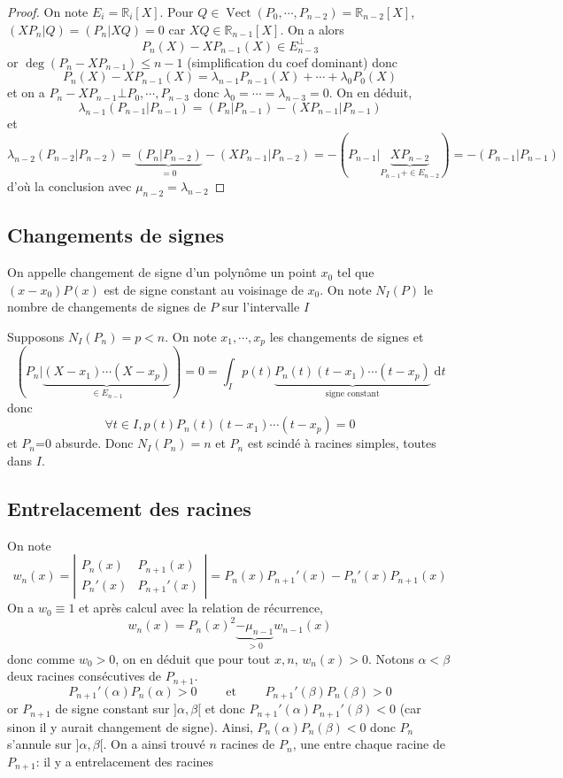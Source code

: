 \documentclass{article}
\theoremstyle{definition}
\DeclareMathOperator{\Vect}{Vect}
\begin{document}
\begin{proof} On note $E_i=\mathbb R_i[X]$.
Pour $Q\in\Vect(P_0, \cdots, P_{n-2})=\mathbb R_{n-2}[X]$, $(XP_n|Q)=(P_n|XQ)=0$ car $XQ\in\mathbb R_{n-1}[X]$. On a alors \[
    P_n(X)-XP_{n-1}(X)\in E_{n-3}^\bot
\]
or $\deg (P_n-XP_{n-1})\leq n-1$ (simplification du coef dominant) donc \[
    P_n(X)-XP_{n-1}(X)=\lambda_{n-1}P_{n-1}(X)+\cdots +\lambda_0P_0(X)
\]
et on a $P_n-XP_{n-1}\bot P_0, \cdots, P_{n-3}$ donc $\lambda_0=\cdots =\lambda_{n-3}=0$. On en déduit, \[
    \lambda_{n-1}(P_{n-1}|P_{n-1})=(P_n|P_{n-1})-(XP_{n-1}|P_{n-1})
\]
et \[
    \lambda_{n-2}(P_{n-2}|P_{n-2})=\underbrace{(P_n|P_{n-2})}_{=0}-(XP_{n-1}|P_{n-2})=-(P_{n-1}|\underbrace{XP_{n-2}}_{P_{n-1}+\in E_{n-2}})=-(P_{n-1}|P_{n-1})
\]
d'où la conclusion avec $\mu_{n-2}=\lambda_{n-2}$
\end{proof}

\subsection{Changements de signes}

On appelle changement de signe d'un polynôme un point $x_0$ tel que $(x-x_0)P(x)$ est de signe constant au voisinage de $x_0$. On note $N_I(P)$ le nombre de changements de signes de $P$ sur l'intervalle $I$

Supposons $N_I(P_n)=p<n$. On note $x_1, \cdots, x_p$ les changements de signes et \[
    (P_n | \underbrace{(X-x_1)\cdots (X-x_p)}_{\in E_{n-1}})=0=\int_Ip(t)\underbrace{P_n(t)(t-x_1)\cdots (t-x_p)}_{\text{signe constant}}\;\mathrm dt
\]
donc \[
    \forall t\in I, p(t)P_n(t)(t-x_1)\cdots (t-x_p)=0
\]
et $P_n$=0 absurde. Donc $N_I(P_n)=n$ et $P_n$ est scindé à racines simples, toutes dans $I$.

\subsection{Entrelacement des racines}

On note \[
    w_n(x)=\left|\begin{matrix}P_n(x) & P_{n+1}(x)\\ P_n'(x) & P_{n+1}'(x)\end{matrix}\right|=P_n(x)P_{n+1}'(x)-P_n'(x)P_{n+1}(x)
\]
On a $w_0\equiv 1$ et après calcul avec la relation de récurrence, \[
    w_n(x)=P_n(x)^2\underbrace{-\mu_{n-1}}_{>0}w_{n-1}(x)
\]
donc comme $w_0>0$, on en déduit que pour tout $x, n$, $w_n(x)>0$. Notons $\alpha < \beta$ deux racines consécutives de $P_{n+1}$. \[
    P_{n+1}'(\alpha)P_n(\alpha)>0\qquad \text{ et }\qquad P_{n+1}'(\beta)P_n(\beta)>0
\] or $P_{n+1}$ de signe constant sur $]\alpha, \beta[$ et donc $P_{n+1}'(\alpha)P_{n+1}'(\beta)<0$ (car sinon il y aurait changement de signe). Ainsi, $P_n(\alpha)P_n(\beta)<0$ donc $P_n$ s'annule sur $]\alpha, \beta[$. On a ainsi trouvé $n$ racines de $P_n$, une entre chaque racine de $P_{n+1}$: il y a entrelacement des racines
\end{document}
